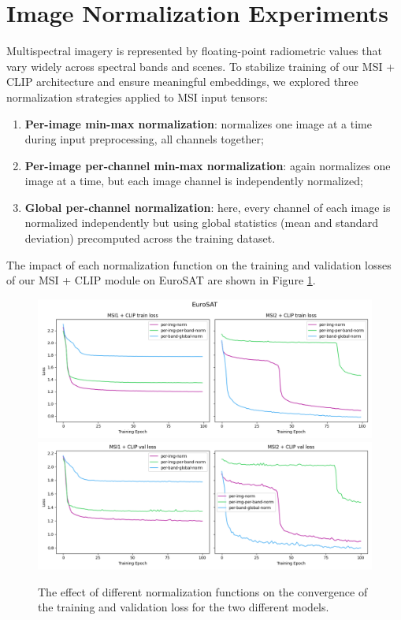 \documentclass[a4paper, oneside, english]{sapthesis} %
\begin{document}
\section{Image Normalization Experiments}


Multispectral imagery is represented by floating-point radiometric values that vary widely across spectral bands and scenes. To stabilize training of our MSI + CLIP architecture and ensure meaningful embeddings, we explored three normalization strategies applied to MSI input tensors:

\begin{enumerate}
    \item \textbf{Per-image min-max normalization}: normalizes one image at a time during input preprocessing, all channels together;
    \item \textbf{Per-image per-channel min-max normalization}: again normalizes one image at a time, but each image channel is independently normalized;
    \item \textbf{Global per-channel normalization}: here, every channel of each image is normalized independently but using global statistics (mean and standard deviation) precomputed across the training dataset.
\end{enumerate}

The impact of each normalization function on the training and validation losses of our MSI + CLIP module on EuroSAT are shown in Figure \ref{fig:normlosses}.

\begin{figure}[h]
    \centering
    \includegraphics[width=\textwidth]{img/EuroSAT_norm_train_losses_plot.png}
    \includegraphics[width=\textwidth]{img/EuroSAT_norm_val_losses_plot.png}
    \caption{The effect of different normalization functions on the convergence of the training and validation loss for the two different models.}
    \label{fig:normlosses}
\end{figure}
\end{document}
